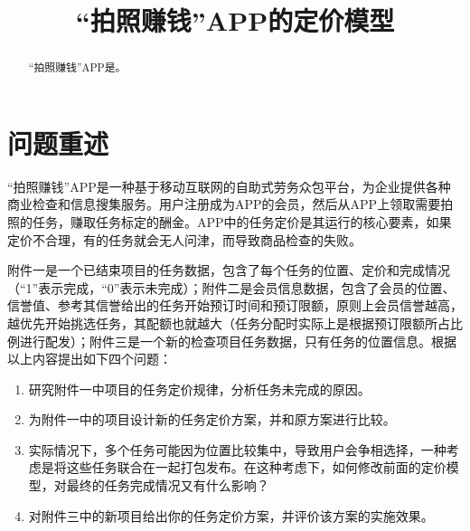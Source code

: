 \documentclass[withoutpreface,bwprint]{cumcmthesis} %
\title{“拍照赚钱”APP的定价模型}
\begin{document}
\maketitle
\begin{abstract}
    “拍照赚钱”APP是。

\end{abstract}
\section{问题重述}
“拍照赚钱”APP是一种基于移动互联网的自助式劳务众包平台，为企业提供各种商业检查和信息搜集服务。用户注册成为APP的会员，然后从APP上领取需要拍照的任务，赚取任务标定的酬金。APP中的任务定价是其运行的核心要素，如果定价不合理，有的任务就会无人问津，而导致商品检查的失败。

附件一是一个已结束项目的任务数据，包含了每个任务的位置、定价和完成情况（“1”表示完成，“0”表示未完成）；附件二是会员信息数据，包含了会员的位置、信誉值、参考其信誉给出的任务开始预订时间和预订限额，原则上会员信誉越高，越优先开始挑选任务，其配额也就越大（任务分配时实际上是根据预订限额所占比例进行配发）；附件三是一个新的检查项目任务数据，只有任务的位置信息。根据以上内容提出如下四个问题：

\begin{enumerate}
    \item 研究附件一中项目的任务定价规律，分析任务未完成的原因。
    \item 为附件一中的项目设计新的任务定价方案，并和原方案进行比较。
    \item 实际情况下，多个任务可能因为位置比较集中，导致用户会争相选择，一种考虑是将这些任务联合在一起打包发布。在这种考虑下，如何修改前面的定价模型，对最终的任务完成情况又有什么影响？
    \item 对附件三中的新项目给出你的任务定价方案，并评价该方案的实施效果。
\end{enumerate}
\end{document}
